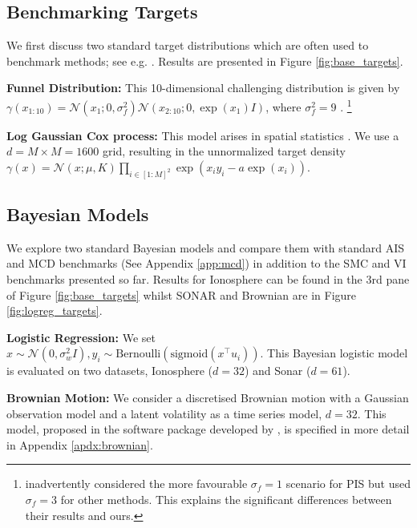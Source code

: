 \documentclass{article} %
\begin{document}

\subsection{Benchmarking Targets}
We first discuss two standard target distributions which are often used to benchmark methods; see e.g. \citep{Neal:2003,arbel2021annealed,heng2020controlled,zhangyongxinchen2021path}. Results are presented in Figure \ref{fig:base_targets}.

\textbf{Funnel Distribution:} This 10-dimensional challenging distribution is given by $\gamma(x_{1:10})= \mathcal{N}(x_1;0, \sigma_{f}^2)\mathcal{N}(x_{2:10};0, \exp(x_1) I)$,
where $\sigma_{f}^2=9$ \citep{Neal:2003}.
\footnote{\cite{zhangyongxinchen2021path} inadvertently considered the more favourable $\sigma_f=1$ scenario for PIS but used $\sigma_f=3$ for other methods. This explains the significant differences between their results and ours.}

\textbf{Log Gaussian Cox process:} This model arises in spatial statistics \citep{Moller:1998}. We use a $d\!=\!M \times M\!=\!1600$ grid, resulting in the unnormalized target density $\gamma(x) = \mathcal{N}(x ; \mu, K) \textstyle\prod_{i \in [1:M]^{2}} \exp(x_{i} y_{i} - a \exp(x_i) )$.
\subsection{Bayesian Models}
We explore two standard Bayesian models and compare them with standard AIS and MCD benchmarks (See  Appendix \ref{app:mcd}) in addition to the SMC and VI benchmarks presented so far. Results for Ionosphere can be found in the 3rd pane of Figure \ref{fig:base_targets} whilst SONAR and Brownian are in Figure \ref{fig:logreg_targets}.

\textbf{Logistic Regression:} We set $ x \sim \mathcal{N}(0, \sigma_w^2 I),y_i \sim \mathrm{Bernoulli}(\mathrm{sigmoid}( x^\top u_i))$. This Bayesian logistic model is evaluated on two datasets, Ionosphere ($d=32$) and Sonar ($d=61$).

\textbf{Brownian Motion:} We consider a discretised Brownian motion with a Gaussian observation model and a latent volatility as a time series model, $d=32$. This model, proposed in the  software package developed by \cite{inferencegym2020}, is specified in more detail in Appendix \ref{apdx:brownian}.
\end{document}
